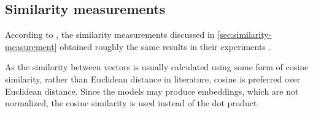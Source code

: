 \subsection*{Similarity measurements}\label{subsec:evaluation-sim-measurements}

According to \citeauthor{HfsentTrans2019}, the similarity measurements discussed in \autoref{sec:similarity-measurement} 
obtained roughly the same results in their experiments \cite{HfsentTrans2019}.   

As the similarity between vectors is usually calculated using some form of cosine similarity, 
rather than Euclidean distance in literature, cosine is preferred over Euclidean distance. 
Since the models may produce embeddings, which are not normalized, the cosine similarity is used instead of the dot product.